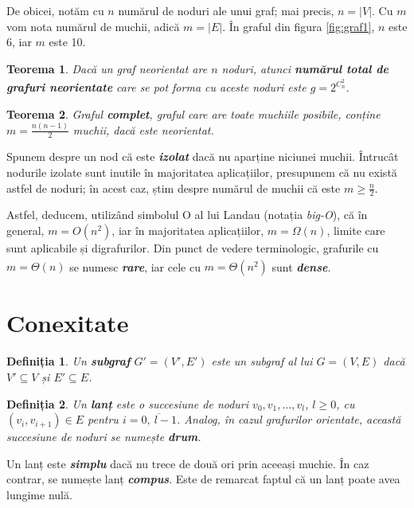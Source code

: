 \documentclass[9pt,a4paper]{report}
\newtheorem{definitie}{Definiția}
\newtheorem{teorema}{Teorema}
\begin{document}
De obicei, notăm cu $n$ numărul de noduri ale unui graf; mai precis, $n = |V|$. Cu $m$ vom nota numărul de muchii, adică $m = |E|$. În graful din figura \ref{fig:graf1}, $n$ este 6, iar $m$ este 10.

\begin{teorema}
    Dacă un graf neorientat are $n$ noduri, atunci \textbf{\textit{numărul total de grafuri neorientate}}\textsuperscript{\cite{milosescu}} care se pot forma cu aceste noduri este $g = 2^{C_n^2}$.
\end{teorema}

\begin{teorema}
    Graful \textbf{\textit{complet}}, graful care are toate muchiile posibile, conține $m = \frac{n(n-1)}{2}$ muchii, dacă este neorientat.
\end{teorema}

Spunem despre un nod că este \textbf{\textit{izolat}} dacă nu aparține niciunei muchii. Întrucât nodurile izolate sunt inutile în majoritatea aplicațiilor, presupunem că nu există astfel de noduri; în acest caz, știm despre numărul de muchii că este $m \geq \frac{n}{2}$.

Astfel, deducem, utilizând simbolul O al lui Landau (notația \textit{big-O}), că în general, $m = O(n^2)$, iar în majoritatea aplicațiilor, $m = \Omega(n)$, limite care sunt aplicabile și digrafurilor. Din punct de vedere terminologic, grafurile cu $m = \Theta(n)$ se numesc \textbf{\textit{rare}}, iar cele cu $m = \Theta(n^2)$ sunt \textbf{\textit{dense}}\textsuperscript{\cite{gabow}}.

\section{Conexitate}

\begin{definitie}
    Un \textbf{subgraf} $G' = (V', E')$ este un subgraf al lui $G = (V, E)$ dacă $V' \subseteq V$ și $E' \subseteq E$.
\end{definitie}
\begin{definitie}
    Un \textbf{lanț} este o succesiune de noduri $v_0, v_1, \dots, v_l$, $l \geq 0$, cu $(v_i, v_{i+1}) \in E$ pentru $i = \overline{0, \ l - 1}$. Analog, în cazul grafurilor orientate, această succesiune de noduri se numește \textbf{drum}.
\end{definitie}

Un lanț este \textbf{\textit{simplu}} dacă nu trece de două ori prin aceeași muchie. În caz contrar, se numește lanț \textbf{\textit{compus}}. Este de remarcat faptul că un lanț poate avea lungime nulă.
\end{document}
